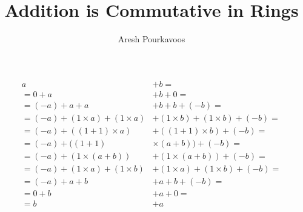 \documentclass{article}
\begin{document}
\title{Addition is Commutative in Rings}
\author{Aresh Pourkavoos}
\maketitle

\begin{align*}
  a&+b= \\
  =0+a&+b+0= \\
  =(-a)+a+a&+b+b+(-b)= \\
  =(-a)+(1 \times a)+(1 \times a)&+(1 \times b)+(1 \times b)+(-b)= \\
  =(-a)+((1+1) \times a)&+((1+1) \times b)+(-b)= \\
  =(-a)+((1+1) &\times (a+b))+(-b)= \\
  =(-a)+(1 \times (a+b))&+(1 \times (a+b))+(-b)= \\
  =(-a)+(1 \times a)+(1 \times b)&+(1 \times a)+(1 \times b)+(-b)= \\
  =(-a)+a+b&+a+b+(-b)= \\
  =0+b&+a+0= \\
  =b&+a \\
\end{align*}

\end{document}

